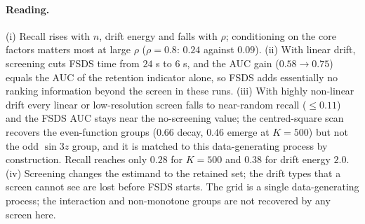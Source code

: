 \paragraph{Reading.}
(i) Recall rises with $n$, drift energy and falls with $\rho$; conditioning on the core factors matters most at large $\rho$ ($\rho=0.8$: $0.24$ against $0.09$). (ii) With linear drift, screening cuts FSDS time from $24$ s to $6$ s, and the AUC gain ($0.58\to0.75$) equals the AUC of the retention indicator alone, so FSDS adds essentially no ranking information beyond the screen in these runs. (iii) With highly non-linear drift every linear or low-resolution screen falls to near-random recall ($\le0.11$) and the FSDS AUC stays near the no-screening value; the centred-square scan recovers the even-function groups ($0.66$ decay, $0.46$ emerge at $K=500$) but not the odd $\sin 3z$ group, and it is matched to this data-generating process by construction. Recall reaches only $0.28$ for $K=500$ and $0.38$ for drift energy $2.0$. (iv) Screening changes the estimand to the retained set; the drift types that a screen cannot see are lost before FSDS starts. The grid is a single data-generating process; the interaction and non-monotone groups are not recovered by any screen here.

